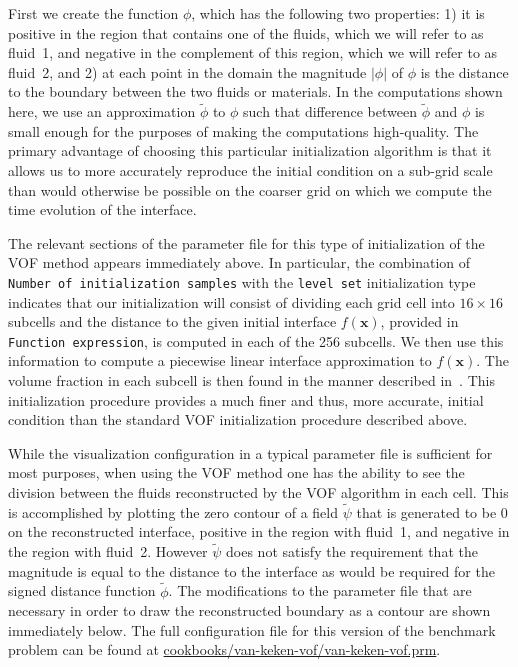 First we create the function $\phi$, which has the following two properties: 1) it is positive 
in the region that contains one of the fluids, which we will refer to as fluid~1, and negative 
in the complement of this region, which we will refer to as fluid~2, and 2) at each point in 
the domain the magnitude $| \phi |$ of $\phi$ is the distance to the boundary between the 
two fluids or materials.
In the computations shown here, we use an approximation $\tilde{\phi}$ to $\phi$ such that   
difference between $\tilde{\phi}$ and $\phi$ is small enough for the purposes of making the 
computations high-quality.
The primary advantage of choosing this particular initialization algorithm is that it allows us 
to more accurately reproduce the initial condition on a sub-grid scale than would otherwise be 
possible on the coarser grid on which we compute the time evolution of the interface. 




The relevant sections of the parameter file for this type of initialization of the VOF method 
appears immediately above.
In particular, the combination of \texttt{Number of initialization samples} with the 
\texttt{level set} initialization type indicates that our initialization will consist of 
dividing each grid cell into $16 \times 16$ subcells and the distance to the given initial 
interface $f(\mathbf x)$, provided in \texttt{Function expression}, is computed in each of the 256 
subcells.
We then use this information to compute a piecewise linear interface approximation to $f(\mathbf x)$.
The volume fraction in each subcell is then found in the manner described 
in~\cite{JMR:2019,JMR-EGP:2019}.
This initialization procedure provides a much finer and thus, more accurate, initial condition 
than the standard VOF initialization procedure described above.

While the visualization configuration in a typical parameter file is sufficient for most 
purposes, when using the VOF method one has the ability to see the division between the fluids 
reconstructed by the VOF algorithm in each cell.
This is accomplished by plotting the zero contour of a field $\tilde\psi$ that
is generated to be $0$ on the reconstructed interface, positive in the region
with fluid~1, and negative in the region with fluid~2.
However $\tilde{\psi}$ does not satisfy the requirement that the magnitude is
equal to the distance to the interface as would be required for the signed
distance function $\tilde{\phi}$.
The modifications to the parameter file that are necessary in order to draw the reconstructed 
boundary as a contour are shown immediately below.
The full configuration file for this version of the benchmark problem can be found at 
\url{cookbooks/van-keken-vof/van-keken-vof.prm}.

